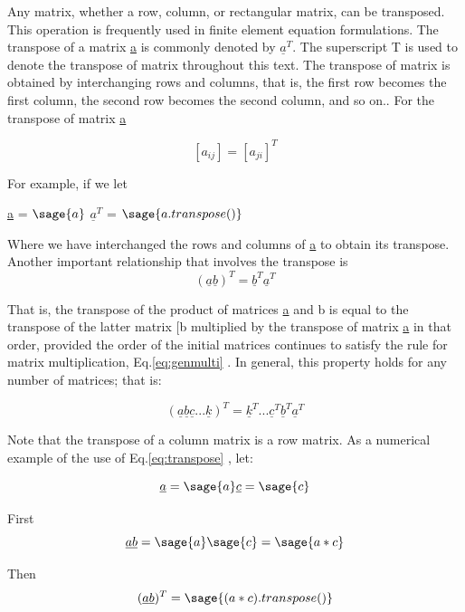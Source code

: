 \documentclass[12pt]{report}
\newcommand{\gen}[1]
{
	[#1_{{ij}}]
}
\newcommand{\lab}[1]{
	Eq.\ref{#1}
}
\begin{document}
Any matrix, whether a row, column, or rectangular matrix, can be
transposed. This operation is frequently used in finite element
equation formulations. The transpose of a matrix \underline{a} is
commonly denoted by $\underline{a}^T$. The superscript T is used to
denote the transpose of matrix throughout this text. The transpose of
matrix is obtained by interchanging rows and columns, that is, the
first row becomes the first column, the second row becomes the second
column, and so on.. For the transpose of matrix \underline{a}

\begin{equation}
	\gen{a} =[a_{{ji}}]^T
\end{equation}

For example, if we let
\begin{center}
	\underline{a} = $\sage{a}$
	$\underline{a}^T$ = $\sage{a.transpose()}$
\end{center}

Where we have interchanged the rows and columns of \underline{a} to
obtain its transpose.
Another important relationship that involves the
transpose is
\begin{equation}
	(\underline{a}\underline{b})^T = \underline{b}^T \underline{a}^T
	\label{eq:transpose}
\end{equation}

That is, the transpose of the product of matrices \underline{a} and
b is equal to the transpose of the latter matrix
[b multiplied by the transpose of matrix \underline{a} in
that order, provided the order of the initial matrices continues to
satisfy the rule for matrix multiplication,\lab{eq:genmulti}. In general,
this property holds for any number of matrices; that is:

\begin{equation}
	(\underline{a}\underline{b}\underline{c}...\underline{k})^T = \underline{k}^T... \underline{c}^T\underline{b}^T\underline{a}^T 
\end{equation} 

Note that the transpose of a column matrix is a row matrix. As a
numerical example of the use of \lab{eq:transpose}, let:

$$\underline{a} = \sage{a}  \underline{c} = \sage{c}$$

First$$\underline{a}\underline{b} = \sage{a}\sage{c}=\sage{a*c}$$

Then 
\begin{equation}
	(\underline{a}\underline{b})^T= \sage{(a*c).transpose()}
	\label{eq:transeg1}
\end{equation}
\end{document}
